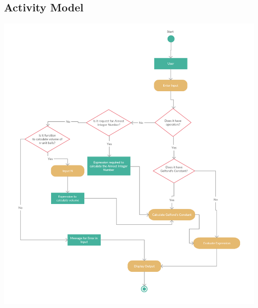 \documentclass{article}
\begin{document}
\clearpage
\subsection{Activity Model}
\begin{center}
    \includegraphics[scale=0.37]{images/n4-activity-model.png}
\end{center}

\printbibliography
\end{document}
